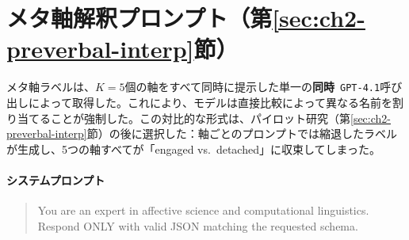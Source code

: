 \section{メタ軸解釈プロンプト（第\ref{sec:ch2-preverbal-interp}節）}
\label{app:exp8_prompt}

メタ軸ラベルは、$K=5$個の軸をすべて同時に提示した単一の\textbf{同時}\ \texttt{GPT-4.1}呼び出しによって取得した。これにより、モデルは直接比較によって異なる名前を割り当てることが強制した。この対比的な形式は、パイロット研究（第\ref{sec:ch2-preverbal-interp}節）の後に選択した：軸ごとのプロンプトでは縮退したラベルが生成し、5つの軸すべてが「engaged vs.\ detached」に収束してしまった。

\paragraph{システムプロンプト}
\begin{quote}
\small\ttfamily
You are an expert in affective science and computational linguistics.
Respond ONLY with valid JSON matching the requested schema.
\end{quote}

